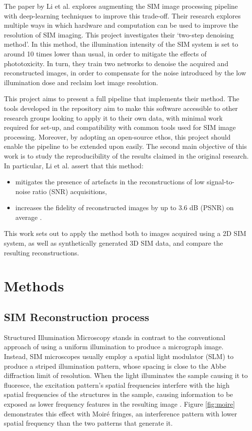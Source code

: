 \documentclass[12pt]{article}
\begin{document}
The paper by Li et al. \cite{keypaper} explores augmenting the SIM image processing pipeline with deep-learning techniques to improve this trade-off.
Their research explores multiple ways in which hardware and computation can be used to improve the resolution of SIM imaging.
This project investigates their `two-step denoising method'.
In this method, the illumination intensity of the SIM system is set to around 10 times lower than usual,
in order to mitigate the effects of phototoxicity.
In turn, they train two networks to denoise the acquired and reconstructed images,
in order to compensate for the noise introduced by the low illumination dose and reclaim lost image resolution.

This project aims to present a full pipeline that implements their method.
The tools developed in the repository aim to make this software accessible to other research groups looking to apply it to their own data,
with minimal work required for set-up, and compatibility with common tools used for SIM image processing.
Moreover, by adopting an open-source ethos, this project should enable the pipeline to be extended upon easily.
The second main objective of this work is to study the reproducibility of the results claimed in the original research.
In particular, Li et al. assert that this method:
\begin{itemize}
    \item mitigates the presence of artefacts in the reconstructions of low signal-to-noise ratio (SNR) acquisitions,
    \item increases the fidelity of reconstructed images by up to 3.6 dB (PSNR) on average \cite{keypaper}.
\end{itemize}
This work sets out to apply the method both to images acquired using a 2D SIM system,
as well as synthetically generated 3D SIM data, and compare the resulting reconstructions.

\section{Methods}

\subsection{SIM Reconstruction process}

Structured Illumination Microscopy stands in contrast to the conventional approach of using a uniform illumination to produce a micrograph image.
Instead, SIM microscopes usually employ a spatial light modulator (SLM) to produce a striped illumination pattern,
whose spacing is close to the Abbe diffraction limit of resolution.
When the light illuminates the sample causing it to fluoresce,
the excitation pattern's spatial frequencies interfere with the high spatial frequencies of the structures in the sample,
causing information to be exposed as lower frequency features in the resulting image \cite{SIM2008}.
Figure \ref{fig:moire} demonstrates this effect with Moir\'{e} fringes,
an interference pattern with lower spatial frequency than the two patterns that generate it.
\end{document}
